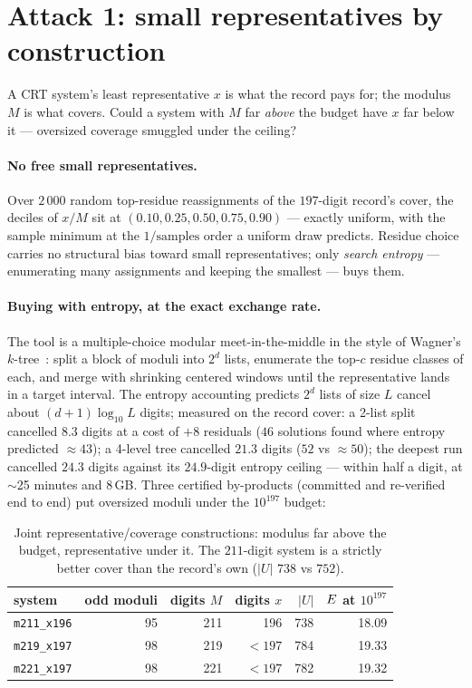 \section{Attack 1: small representatives by construction}\label{sec:joint}

A CRT system's least representative $x$ is what the record pays for; the
modulus $M$ is what covers. Could a system with $M$ far \emph{above}
the budget have $x$ far below it --- oversized coverage smuggled under
the ceiling?

\paragraph{No free small representatives.} Over $2\,000$ random
top-residue reassignments of the $197$-digit record's cover, the
deciles of $x/M$ sit at $(0.10,0.25,0.50,0.75,0.90)$ --- exactly
uniform, with the sample minimum at the $1/\text{samples}$ order a
uniform draw predicts. Residue choice carries no structural bias toward
small representatives; only \emph{search entropy} --- enumerating many
assignments and keeping the smallest --- buys them.

\paragraph{Buying with entropy, at the exact exchange rate.} The tool
is a multiple-choice modular meet-in-the-middle in the style of
Wagner's $k$-tree~\cite{Wagner}: split a block of moduli into $2^d$
lists, enumerate the top-$c$ residue classes of each, and merge with
shrinking centered windows until the representative lands in a target
interval. The entropy accounting predicts $2^d$ lists of size $L$
cancel about $(d{+}1)\log_{10}L$ digits; measured on the record cover:
a 2-list split cancelled $8.3$ digits at a cost of $+8$ residuals
($46$ solutions found where entropy predicted $\approx43$); a 4-level
tree cancelled $21.3$ digits ($52$ vs $\approx50$); the deepest run
cancelled $24.3$ digits against its $24.9$-digit entropy ceiling ---
within half a digit, at $\sim$25 minutes and 8\,GB. Three certified
by-products (committed and re-verified end to end) put oversized moduli
under the $10^{197}$ budget:

\begin{table}[h]
\centering\small
\caption{Joint representative/coverage constructions: modulus far above
the budget, representative under it. The $211$-digit system is a
strictly better cover than the record's own ($|U|$ $738$ vs $752$).}
\label{tab:joint}
\begin{tabular}{lrrrrr}
\toprule
system & odd moduli & digits $M$ & digits $x$ & $|U|$ & $E$ at $10^{197}$\\
\midrule
\texttt{m211\_x196} & 95 & 211 & 196 & 738 & 18.09\\
\texttt{m219\_x197} & 98 & 219 & $<197$ & 784 & 19.33\\
\texttt{m221\_x197} & 98 & 221 & $<197$ & 782 & 19.32\\
\bottomrule
\end{tabular}
\end{table}


